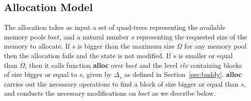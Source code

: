 

\subsection{Allocation Model}

The allocation takes as input a set of quad-trees representing the available memory pools $bset$, and a natural number $s$ representing the requested size of the memory to allocate. If $s$ is bigger than the maximum size $\Omega$ for any memory pool then the allocation fails and the state is not modified. If $s$ is smaller or equal than $\Omega$, then it calls function \textbf{alloc} over $bset$ and the level $rlv$ containing blocks of size bigger or equal to $s$, given by $\Delta_s$ as defined in Section~\ref{sec:buddy}. \textbf{alloc} carries out the necessary operations to find a block of size bigger or equal than $s$, and conducts the necessary modifications on $bset$ as we describe below. 

